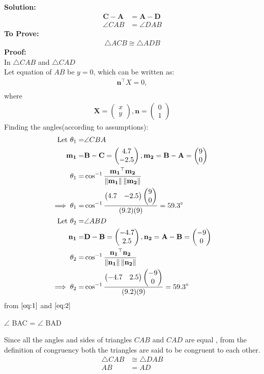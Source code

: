 \documentclass{article}
\providecommand{\norm}[1]{\left\lVert#1\right\rVert}
\newcommand{\solution}{\noindent \textbf{Solution: }}
\newcommand{\myvec}[1]{\ensuremath{\begin{pmatrix}#1\end{pmatrix}}}
\let\vec\mathbf
\begin{document}
\solution
\begin{align}
	\vec{C}-\vec{A} &= \vec{A}-\vec{D}\\
	\angle{CAB} &= \angle{DAB}
\end{align}
\textbf{To Prove:}
	\begin{align}
		\triangle{ACB} \cong \triangle{ADB}
	\end{align}
\textbf{Proof:}\\
In $\triangle{CAB}$ and $\triangle{CAD}$\\
Let  equation of $AB$ be $y = 0$, which can be written as:
\begin{align}
\vec{n}^{\top}X = 0,\\
\end{align}
where
\begin{align}
\vec{X} = \myvec{x\\y},\vec{n} = \myvec{0\\1}
\end{align}
	Finding the angles(according to assumptions):
		\begin{align}
\text{Let }\theta_1=&\angle CBA\\
\vec{m_1}=&\vec{B}-\vec{C}=\myvec{4.7\\-2.5}, \vec{m_2}=\vec{B}-\vec{A}=\myvec{9\\0}\\
\theta_1=&\cos^{-1}\frac{\vec{m_1}^\top\vec{m_2}}{\norm{\vec{m_1}}\norm{\vec{m_2}}}\\
\implies\theta_1=&\cos^{-1}\frac{\myvec{4.7&-2.5}\myvec{9\\0}}{(9.2)(9)}=59.3\degree
\label{eq:1}\\
\text{Let }\theta_2=&\angle ABD\\
\vec{n_1}=&\vec{D}-\vec{B}=\myvec{-4.7\\2.5}, \vec{n_2}=\vec{A}-\vec{B}=\myvec{-9\\0}\\
\theta_2 =& \cos^{-1}\frac{\vec{n_1}^\top\vec{n_2}}{\norm{\vec{n_1}}\norm{\vec{n_2}}}\\
\implies\theta_2=&\cos^{-1}\frac{\myvec{-4.7&2.5}\myvec{-9\\0}}{(9.2)(9)}=59.3\degree
\label{eq:2}\\
\end{align}
from $\eqref{eq:1}$ and $\eqref{eq:2}$
\begin{center}
$\angle$ BAC = $\angle$ BAD 
\end{center}
Since all the angles and sides of triangles $CAB$ and $CAD$ are equal , from the definition of congruency both the triangles are said to be congruent to each other.
\begin{align}
	\triangle{CAB} &\cong \triangle{DAB}\\
	AB &= AD 
\end{align}
\end{document}
